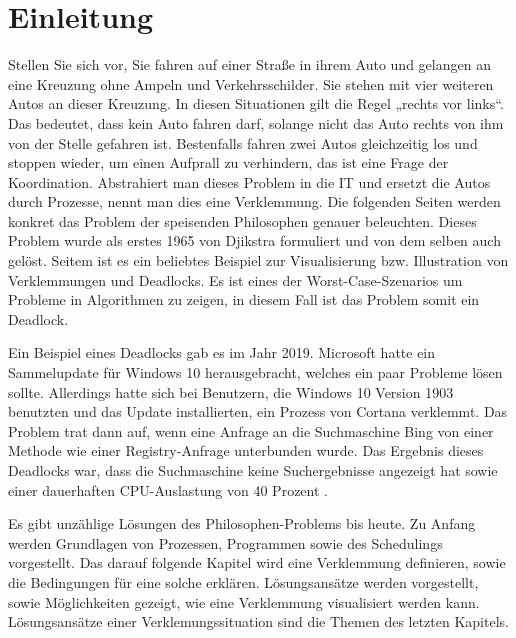 \chapter{Einleitung}
\label{sec:Einleitung}
Stellen Sie sich vor, Sie fahren auf einer Straße in ihrem Auto und gelangen an eine Kreuzung ohne Ampeln und Verkehrsschilder. Sie stehen mit vier weiteren Autos an dieser Kreuzung. In diesen Situationen gilt die Regel „rechts vor links“. Das bedeutet, dass kein Auto fahren darf, solange nicht das Auto rechts von ihm von der Stelle gefahren ist. Bestenfalls fahren zwei Autos gleichzeitig los und stoppen wieder, um einen Aufprall zu verhindern, das ist eine Frage der Koordination.
Abstrahiert man dieses Problem in die IT und ersetzt die Autos durch Prozesse, nennt man dies eine Verklemmung.
Die folgenden Seiten werden konkret das Problem der speisenden Philosophen genauer beleuchten.
Dieses Problem wurde als erstes 1965 von Djikstra formuliert und von dem selben auch gelöst. Seitem ist es ein beliebtes Beispiel zur Visualisierung bzw. Illustration von Verklemmungen und Deadlocks. Es ist eines der Worst-Case-Szenarios um Probleme in Algorithmen zu zeigen, in diesem Fall ist das Problem somit ein Deadlock.

Ein Beispiel eines Deadlocks gab es im Jahr 2019. Microsoft hatte ein Sammelupdate für Windows 10 herausgebracht, welches ein paar Probleme lösen sollte. Allerdings hatte sich bei Benutzern, die Windows 10 Version 1903 benutzten und das Update installierten, ein Prozess von Cortana verklemmt. Das Problem trat dann auf, wenn eine Anfrage an die Suchmaschine Bing von einer Methode wie einer Registry-Anfrage unterbunden wurde. Das Ergebnis dieses Deadlocks war, dass die Suchmaschine keine Suchergebnisse angezeigt hat sowie einer dauerhaften CPU-Auslastung von 40 Prozent \parencite[vgl.][]{bug}.

Es gibt unzählige Lösungen des Philosophen-Problems bis heute. 
Zu Anfang werden Grundlagen von Prozessen, Programmen sowie des Schedulings vorgestellt. Das darauf folgende Kapitel wird eine Verklemmung definieren, sowie die Bedingungen für eine solche erklären. 
Lösungsansätze werden vorgestellt, sowie Möglichkeiten gezeigt, wie eine Verklemmung visualisiert werden kann. Lösungsansätze einer Verklemungssituation sind die Themen des letzten Kapitels.